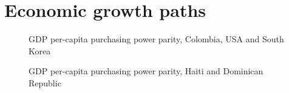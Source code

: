 \documentclass[
  ignorenonframetext,
]{beamer}
\begin{document}
\section{Economic growth paths}\label{economic-growth-paths}

\begin{frame}{}
\label{section-4}
\begin{figure}


\caption{\label{fig-growth-paths-usa-col-kor}GDP per-capita purchasing
power parity, Colombia, USA and South Korea}

\end{figure}%
\end{frame}

\begin{frame}{}
\label{section-5}
\begin{figure}


\caption{\label{fig-growth-paths-hti-dom}GDP per-capita purchasing power
parity, Haiti and Dominican Republic}

\end{figure}%
\end{frame}
\end{document}
